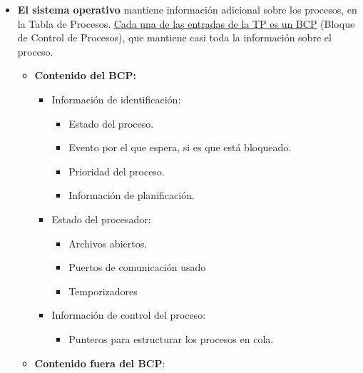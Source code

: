 \documentclass[12pt, twoside, openright]{report} %
\begin{document}
\begin{itemize}
  \item \textbf{El sistema operativo} mantiene información adicional sobre
    los procesos, en la Tabla de Procesos. \underline{Cada una de las
    entradas de la TP es un BCP} (Bloque de Control de Procesos), que
    mantiene casi toda la información sobre el proceso.
    

    \begin{itemize}
    \item \textbf{Contenido del BCP:}
      

      \begin{itemize}
      \item Información de identificación:
        

        \begin{itemize}
        \item Estado del proceso.
          
        \item Evento por el que espera, si es que está bloqueado.
          
        \item Prioridad del proceso.
          
        \item Información de planificación.
          
        \end{itemize}
		\pagebreak
      \item Estado del procesador:
        

        \begin{itemize}
        \item Archivos abiertos.
          
        \item Puertos de comunicación usado
          
        \item Temporizadores
          
        \end{itemize}
      \item Información de control del proceso:
        

        \begin{itemize}
        \item Punteros para estructurar los procesos en cola.
          
        \end{itemize}
      \end{itemize}
    \item \textbf{Contenido fuera del BCP}:
      


\end{itemize}
\end{itemize}
\end{document}
